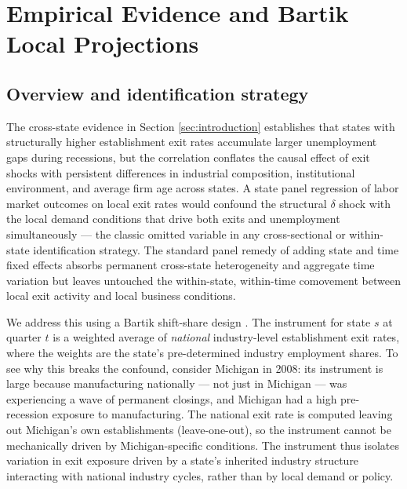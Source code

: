 \documentclass[authoryear, review, 12pt]{elsarticle}
\begin{document}
	

	\section{Empirical Evidence and Bartik Local Projections}\label{sec:empirical}

	\subsection{Overview and identification strategy}\label{sec:empirical_overview}

	The cross-state evidence in Section \ref{sec:introduction} establishes
	that states with structurally higher establishment exit rates accumulate
	larger unemployment gaps during recessions, but the correlation conflates
	the causal effect of exit shocks with persistent differences in industrial
	composition, institutional environment, and average firm age across
	states.  A state panel regression of labor market outcomes on local exit
	rates would confound the structural $\delta$ shock with the local demand
	conditions that drive both exits and unemployment simultaneously --- the
	classic omitted variable in any cross-sectional or within-state
	identification strategy.  The standard panel remedy of adding state and
	time fixed effects absorbs permanent cross-state heterogeneity and
	aggregate time variation but leaves untouched the within-state,
	within-time comovement between local exit activity and local business
	conditions.

	We address this using a Bartik shift-share design
	\citep{bartik_1991,goldsmith_2020}.  The instrument for state $s$ at
	quarter $t$ is a weighted average of \emph{national} industry-level
	establishment exit rates, where the weights are the state's
	pre-determined industry employment shares.  To see why this breaks the
	confound, consider Michigan in 2008: its instrument is large because
	manufacturing nationally --- not just in Michigan --- was experiencing
	a wave of permanent closings, and Michigan had a high pre-recession
	exposure to manufacturing.  The national exit rate is computed leaving
	out Michigan's own establishments (leave-one-out), so the instrument
	cannot be mechanically driven by Michigan-specific conditions.  The
	instrument thus isolates variation in exit exposure driven by a
	state's inherited industry structure interacting with national industry
	cycles, rather than by local demand or policy.
\end{document}
